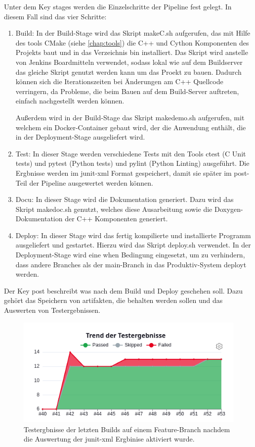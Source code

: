Unter dem Key \glqq stages\grqq{} werden die Einzelschritte der Pipeline fest gelegt. In diesem Fall sind das vier Schritte:
\begin{enumerate}
    \item{Build:} In der Build-Stage wird das Skript makeC.sh aufgerufen, das mit Hilfe des tools CMake (siehe \autoref{chap:tools}) die C++ und Cython Komponenten des Projekts baut und in das Verzeichnis bin installiert. Das Skript wird anstelle von Jenkins Boardmitteln verwendet, sodass lokal wie auf dem Buildserver das gleiche Skript genutzt werden kann um das Proekt zu bauen. Dadurch können sich die Iterationszeiten bei Änderungen am C++ Quellcode verringern, da Probleme, die beim Bauen auf dem Build-Server auftreten, einfach nachgestellt werden können.
    
    Außerdem wird in der Build-Stage das Skript makedemo.sh aufgerufen, mit welchem ein Docker-Container gebaut wird, der die Anwendung enthält, die in der Deployment-Stage ausgeliefert wird.
    \item{Test:} In dieser Stage werden verschiedene Tests mit den Tools ctest (C Unit tests) und pytest (Python tests) und pylint (Python Linting) ausgeführt. Die Ergbnisse werden im junit-xml Format gespeichert, damit sie später im \glqq post\grqq-Teil der Pipeline ausgewertet werden können.
    \item{Docu:} In dieser Stage wird die Dokumentation generiert. Dazu wird das Skript makedoc.sh genutzt, welches diese Ausarbeitung sowie die Doxygen-Dokumentation der C++ Komponenten generiert.
    \item{Deploy:} In dieser Stage wird das fertig kompilierte und installierte Programm ausgeliefert und gestartet. Hierzu wird das Skript deploy.sh verwendet.
    In der Deployment-Stage wird eine \glqq when\grqq{} Bedingung eingesetzt, um zu verhindern, dass andere Branches als der \glqq main\grqq-Branch in das Produktiv-System deployt werden.
\end{enumerate}

Der Key \glqq post\grqq{} beschreibt was nach dem Build und Deploy geschehen soll. Dazu gehört das Speichern von artifakten, die behalten werden sollen und das Auswerten von Testergebnissen.

\begin{figure}
    \label{fig:test_results}
    \centering
    \includegraphics[scale=0.4]{res/Jenkins_test_results.png}
    \caption{Testergbnisse der letzten Builds auf einem Feature-Branch nachdem die Auswertung der junit-xml Ergbinise aktiviert wurde.}
\end{figure}


